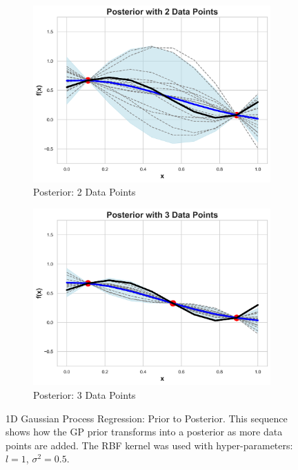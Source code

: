 \documentclass{article}
\begin{document}
\begin{figure}[H]
    \begin{subfigure}[b]{0.4\textwidth}
        \centering
        \includegraphics[width=\textwidth]{LatexPlots/1dplots/Posterior_2_Data_Points.png}
        \caption{Posterior: 2 Data Points}
    \end{subfigure}
    \begin{subfigure}[b]{0.4\textwidth}
        \centering
        \includegraphics[width=\textwidth]{LatexPlots/1dplots/Posterior_3_Data_Points.png}
        \caption{Posterior: 3 Data Points}
    \end{subfigure}

    \caption{1D Gaussian Process Regression: Prior to Posterior. This sequence shows how the GP prior transforms into a posterior as more data points are added. The RBF kernel was used with hyper-parameters: $l = 1$, $\sigma^2 = 0.5$.}
\end{figure}
\end{document}
